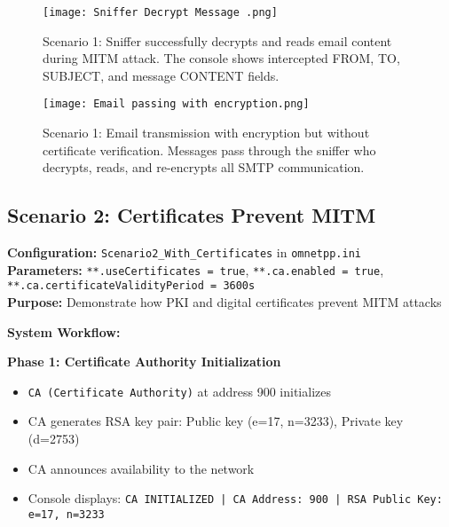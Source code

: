 \documentclass[a4paper,12pt]{extarticle}
\begin{document}
\vspace{0.5cm}

\begin{figure}[H]
    \centering
    \texttt{[image: Sniffer Decrypt Message .png]}
    \caption{Scenario 1: Sniffer successfully decrypts and reads email content during MITM attack. The console shows intercepted FROM, TO, SUBJECT, and message CONTENT fields.}
    \label{fig:sniffer_decrypt}
\end{figure}

\vspace{0.3cm}

\begin{figure}[H]
    \centering
    \texttt{[image: Email passing with encryption.png]}
    \caption{Scenario 1: Email transmission with encryption but without certificate verification. Messages pass through the sniffer who decrypts, reads, and re-encrypts all SMTP communication.}
    \label{fig:email_encryption}
\end{figure}

\vspace{0.4cm}

\subsection{Scenario 2: Certificates Prevent MITM}

\begin{infobox}
\textbf{Configuration:} \texttt{Scenario2\_With\_Certificates} in \texttt{omnetpp.ini}\\
\textbf{Parameters:} \texttt{**.useCertificates = true}, \texttt{**.ca.enabled = true}, \texttt{**.ca.certificateValidityPeriod = 3600s}\\
\textbf{Purpose:} Demonstrate how PKI and digital certificates prevent MITM attacks
\end{infobox}

\vspace{0.3cm}

\textbf{System Workflow:}

\vspace{0.3cm}
\textbf{Phase 1: Certificate Authority Initialization}
\begin{itemize}[leftmargin=1cm]
    \item \texttt{CA (Certificate Authority)} at address 900 initializes
    \item CA generates RSA key pair: Public key (e=17, n=3233), Private key (d=2753)
    \item CA announces availability to the network
    \item Console displays: \texttt{CA INITIALIZED | CA Address: 900 | RSA Public Key: e=17, n=3233}
\end{itemize}
\end{document}

